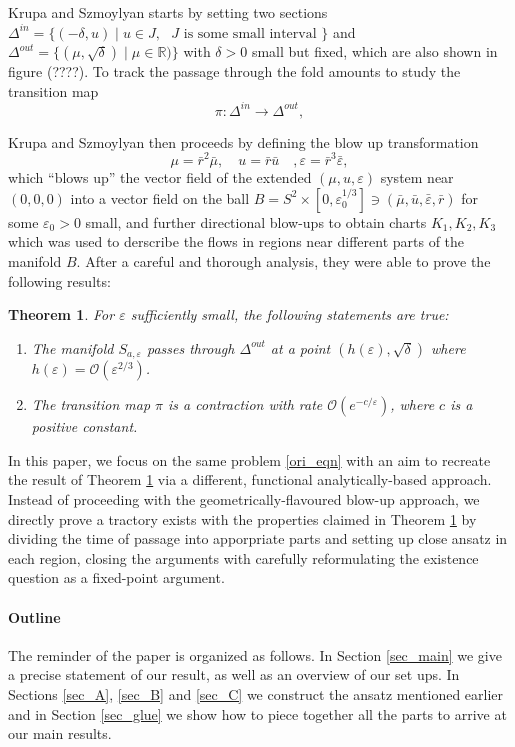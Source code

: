 \documentclass[letterpaper,11pt]{article}
\newcommand{\rmO}{\mathcal{O}}
\newcommand{\eps}{\varepsilon}
\numberwithin{equation}{section}
\theoremstyle{plain}
\newtheorem{theorem}{Theorem}[section]
\begin{document}
Krupa and Szmoylyan starts by setting two sections $\Delta^{in} = \{(-\delta, u) \mid u\in J,\text{ $J$ is some small interval }\}$ and $\Delta^{out} = \{( \mu ,\sqrt{\delta})\mid \mu \in \mathbb{R})\}$ with $\delta>0$ small but fixed, which are also shown in figure (????). To track the passage through the fold amounts to study the transition map 
\[
\pi: \Delta^{in} \to \Delta^{out},
\]

Krupa and Szmoylyan then proceeds by defining the blow up transformation
\[
\mu = \bar{r}^2 \bar{\mu}, \quad u =\bar{r} \bar{u}  \quad, \eps = \bar{r}^3 \bar{\eps},
\]
which ``blows up'' the vector field of the extended $(\mu, u, \eps)$ system near $(0,0,0)$ into a vector field on the ball $B = S^2 \times [0,\eps_0^{1/3}] \ni (\bar{\mu}, \bar{u}, \bar{\eps}, \bar{r})$ for some $\eps_0>0$ small, and further directional blow-ups to obtain charts $K_1,K_2,K_3$ which was used to derscribe the flows in regions near different parts of the manifold $B$. After a careful and thorough analysis, they were able to prove the following results:
\begin{theorem}\label{ks_main}
For $\eps$ sufficiently small, the following statements are true:
\begin{enumerate}
\item The manifold $S_{a,\eps} $ passes through  $\Delta^{out}$ at a point $(h(\eps), \sqrt{\delta})$ where $h(\eps) = \rmO(\eps^{2/3})$.
\item The transition map $\pi$ is a contraction with rate $\rmO(e^{-c/\eps} )$, where $c$ is a positive constant.
\end{enumerate}
\end{theorem}


In this paper, we focus on the same problem \eqref{ori_eqn} with an aim to recreate the result of Theorem \ref{ks_main} via a different, functional analytically-based approach. Instead of proceeding with the geometrically-flavoured blow-up approach, we directly prove a tractory exists with the properties claimed in Theorem \ref{ks_main} by dividing the time of passage into apporpriate parts and setting up close ansatz in each region, closing the arguments with carefully reformulating the existence question as a fixed-point argument.

\paragraph{Outline}
The reminder of the paper is organized as follows. In Section \ref{sec_main} we give a precise statement of our result, as well as an overview of our set ups. In Sections \ref{sec_A}, \ref{sec_B} and \ref{sec_C} we construct the ansatz mentioned earlier and in Section \ref{sec_glue} we show how to piece together all the parts to arrive at our main results.
\end{document}
